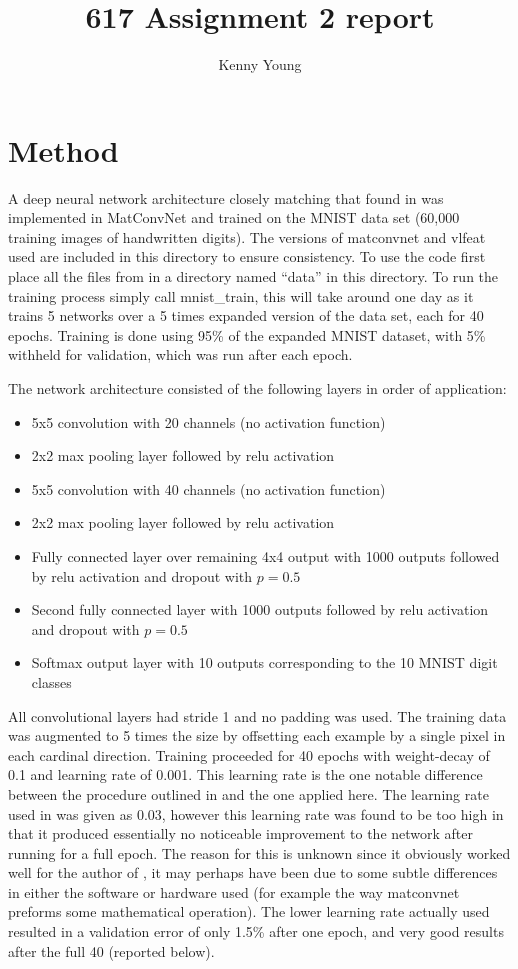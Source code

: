 \documentclass[a4paper,12pt]{article}
\title{617 Assignment 2 report}
\author{Kenny Young}
\begin{document}
\maketitle
\tableofcontents
\section{Method}
A deep neural network architecture closely matching that found in \cite{SRC} was implemented in MatConvNet and trained on the MNIST data set (60,000 training images of handwritten digits). The versions of matconvnet and vlfeat used are included in this directory to ensure consistency. To use the code first place all the files from \cite{MNIST} in a directory named ``data'' in this directory. To run the training process simply call mnist\_train, this will take around one day as it trains 5 networks over a 5 times expanded version of the data set, each for 40 epochs. Training is done using 95\% of the expanded MNIST dataset, with 5\% withheld for validation, which was run after each epoch.

The network architecture consisted of the following layers in order of application:
\begin{itemize}
\item 5x5 convolution with 20 channels (no activation function)
\item 2x2 max pooling layer followed by relu activation
\item 5x5 convolution with 40 channels (no activation function)
\item 2x2 max pooling layer followed by relu activation
\item Fully connected layer over remaining 4x4 output with 1000 outputs followed by relu activation and dropout with $p=0.5$
\item Second fully connected layer with 1000 outputs followed by relu activation and dropout with $p=0.5$
\item Softmax output layer with 10 outputs corresponding to the 10 MNIST digit classes
\end{itemize}

All convolutional layers had stride 1 and no padding was used. The training data was augmented to 5 times the size by offsetting each example by a single pixel in each cardinal direction. Training proceeded for 40 epochs with weight-decay of 0.1 and learning rate of 0.001. This learning rate is the one notable difference between the procedure outlined in \cite{SRC} and the one applied here. The learning rate used in \cite{SRC} was given as 0.03, however this learning rate was found to be too high in that it produced essentially no noticeable improvement to the network after running for a full epoch. The reason for this is unknown since it obviously worked well for the author of \cite{SRC}, it may perhaps have been due to some subtle differences in either the software or hardware used (for example the way matconvnet preforms some mathematical operation). The lower learning rate actually used resulted in a validation error of only 1.5\% after one epoch, and very good results after the full 40 (reported below).
\end{document}
